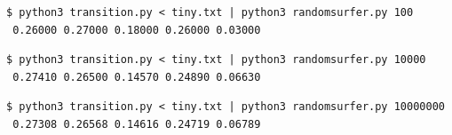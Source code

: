 \documentclass[8pt,a4paper,compress]{beamer}
\begin{document}
\begin{frame}[fragile]
\pause

\begin{lstlisting}[language={}]
$ python3 transition.py < tiny.txt | python3 randomsurfer.py 100
 0.26000 0.27000 0.18000 0.26000 0.03000
\end{lstlisting}

\pause

\begin{lstlisting}[language={}]
$ python3 transition.py < tiny.txt | python3 randomsurfer.py 10000
 0.27410 0.26500 0.14570 0.24890 0.06630
\end{lstlisting}

\pause

\begin{lstlisting}[language={}]
$ python3 transition.py < tiny.txt | python3 randomsurfer.py 10000000
 0.27308 0.26568 0.14616 0.24719 0.06789
\end{lstlisting}
\end{frame}
\end{document}
